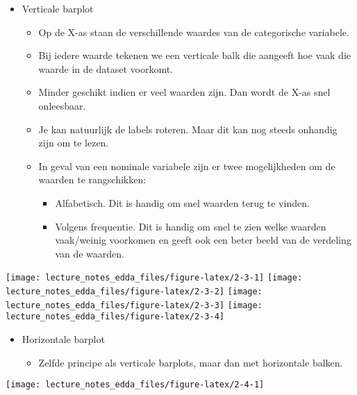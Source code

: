 \documentclass[]{memoir}
\providecommand{\tightlist}{%
  \setlength{\itemsep}{0pt}\setlength{\parskip}{0pt}}
\begin{document}
\begin{itemize}
\tightlist
\item
  Verticale barplot

  \begin{itemize}
  \tightlist
  \item
    Op de X-as staan de verschillende waardes van de categorische
    variabele.
  \item
    Bij iedere waarde tekenen we een verticale balk die aangeeft hoe
    vaak die waarde in de dataset voorkomt.
  \item
    Minder geschikt indien er veel waarden zijn. Dan wordt de X-as snel
    onleesbaar.
  \item
    Je kan natuurlijk de labels roteren. Maar dit kan nog steeds
    onhandig zijn om te lezen.
  \item
    In geval van een nominale variabele zijn er twee mogelijkheden om de
    waarden te rangschikken:

    \begin{itemize}
    \tightlist
    \item
      Alfabetisch. Dit is handig om snel waarden terug te vinden.
    \item
      Volgens frequentie. Dit is handig om snel te zien welke waarden
      vaak/weinig voorkomen en geeft ook een beter beeld van de
      verdeling van de waarden.
    \end{itemize}
  \end{itemize}
\end{itemize}

\texttt{[image: lecture\_notes\_edda\_files/figure-latex/2-3-1]}
\texttt{[image: lecture\_notes\_edda\_files/figure-latex/2-3-2]}
\texttt{[image: lecture\_notes\_edda\_files/figure-latex/2-3-3]}
\texttt{[image: lecture\_notes\_edda\_files/figure-latex/2-3-4]}

\begin{itemize}
\tightlist
\item
  Horizontale barplot

  \begin{itemize}
  \tightlist
  \item
    Zelfde principe als verticale barplots, maar dan met horizontale
    balken.
  \end{itemize}
\end{itemize}

\texttt{[image: lecture\_notes\_edda\_files/figure-latex/2-4-1]}
\end{document}
